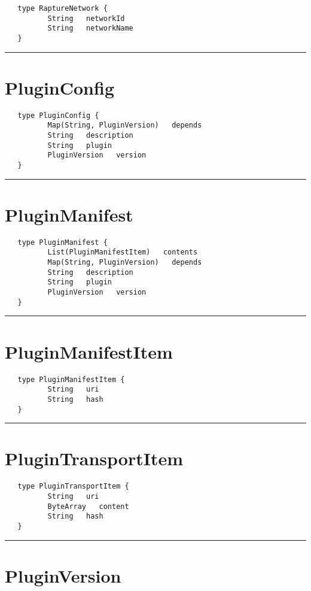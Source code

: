 \begin{verbatim}
   type RaptureNetwork {
          String   networkId
          String   networkName
   }
\end{verbatim}

\rule{15cm}{2pt}
\section{PluginConfig}
\label{type:PluginConfig}

\begin{verbatim}
   type PluginConfig {
          Map(String, PluginVersion)   depends
          String   description
          String   plugin
          PluginVersion   version
   }
\end{verbatim}

\rule{15cm}{2pt}
\section{PluginManifest}
\label{type:PluginManifest}

\begin{verbatim}
   type PluginManifest {
          List(PluginManifestItem)   contents
          Map(String, PluginVersion)   depends
          String   description
          String   plugin
          PluginVersion   version
   }
\end{verbatim}

\rule{15cm}{2pt}
\section{PluginManifestItem}
\label{type:PluginManifestItem}

\begin{verbatim}
   type PluginManifestItem {
          String   uri
          String   hash
   }
\end{verbatim}

\rule{15cm}{2pt}
\section{PluginTransportItem}
\label{type:PluginTransportItem}

\begin{verbatim}
   type PluginTransportItem {
          String   uri
          ByteArray   content
          String   hash
   }
\end{verbatim}

\rule{15cm}{2pt}
\section{PluginVersion}
\label{type:PluginVersion}


